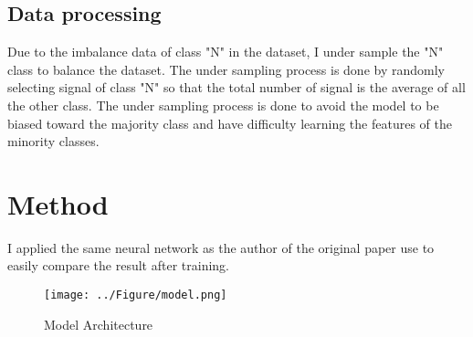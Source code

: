 \documentclass[14pt]{extreport}
\begin{document}
\section{Data processing}
Due to the imbalance data of class "N" in the dataset, I under sample the "N" class to balance the dataset. The under sampling process is done by randomly selecting signal of class "N" so that the total number of signal is the average of all the other class. The under sampling process is done to avoid the model to be biased toward the majority class and have difficulty learning the features of the minority classes.

\chapter{Method}
I applied the same neural network\cite{Model architecture} as the author of the original paper use to easily compare the result after training.
\begin{figure}[H]
    \centering
    \captionsetup{justification=centering,margin=2cm}
    \texttt{[image: ../Figure/model.png]}
    \caption{Model Architecture}
    \label{Model Architecture}
\end{figure}
\end{document}
